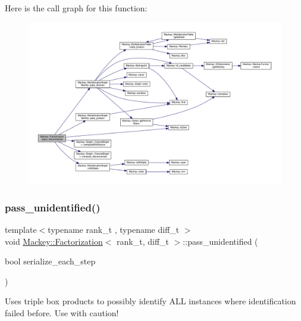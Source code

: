Here is the call graph for this function\+:\nopagebreak
\begin{figure}[H]
\begin{center}
\leavevmode
\includegraphics[width=350pt]{classMackey_1_1Factorization_aad2d840b523d193f4c3554e9e3f7fb00_cgraph}
\end{center}
\end{figure}
\mbox{\label{classMackey_1_1Factorization_a0f1115a0af9f4fb294646aee85ebb2e4}} 
\subsubsection{\texorpdfstring{pass\+\_\+unidentified()}{pass\_unidentified()}}
{\footnotesize\ttfamily template$<$typename rank\+\_\+t , typename diff\+\_\+t $>$ \\
void \hyperlink{classMackey_1_1Factorization}{Mackey\+::\+Factorization}$<$ rank\+\_\+t, diff\+\_\+t $>$\+::pass\+\_\+unidentified (\begin{DoxyParamCaption}\item[{bool}]{serialize\+\_\+each\+\_\+step }\end{DoxyParamCaption})}



Uses triple box products to possibly identify A\+LL instances where identification failed before. Use with caution! 

